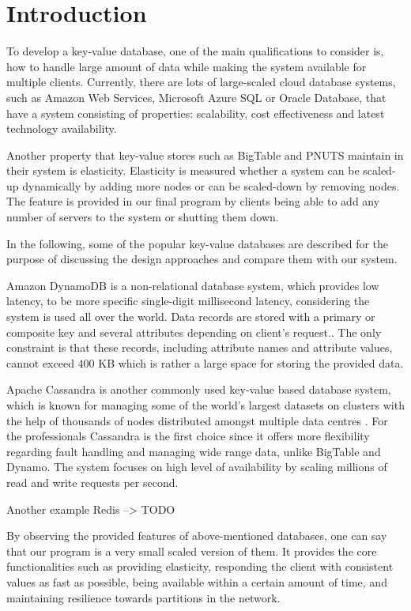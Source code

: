 \section{Introduction}
\label{sec:introduction}

To develop a key-value database, one of the main qualifications to consider is, how to handle large amount of data while making the system available for multiple clients. Currently, there are lots of large-scaled cloud database systems, such as Amazon Web Services, Microsoft Azure SQL or Oracle Database, that have a system consisting of properties: scalability, cost effectiveness and latest technology availability. 

Another property that key-value stores such as BigTable and PNUTS maintain in their system is elasticity. Elasticity is measured whether a system can be scaled-up dynamically by adding more nodes or can be scaled-down by removing nodes\cite{agrawal2011database}. The feature is provided in our final program by clients being able to add any number of servers to the system or shutting them down.

In the following, some of the popular key-value databases are described for the purpose of  discussing the design approaches and compare them with our system.

Amazon DynamoDB is a non-relational database system, which provides low latency, to be more specific single-digit millisecond latency\cite{amazon}, considering the system is used all over the world. Data records are stored with a primary or composite key and several attributes depending on client's request.\cite{kalid2017big}. The only constraint is that these records, including attribute names and attribute values, cannot exceed 400 KB which is rather a large space for storing the provided data\cite{amazon}.

Apache Cassandra is another commonly used key-value based database system, which is known for managing some of the world's largest datasets on clusters with the help of thousands of nodes distributed amongst multiple data centres \cite{chebotko2015big}. For the professionals Cassandra is the first choice since it offers more flexibility regarding fault handling and managing wide range data, unlike BigTable and Dynamo\cite{kalid2017big}. The system focuses on high level of availability by scaling millions of read and write requests per second.

Another example Redis --> TODO \cite{paksula2010persisting}

By observing the provided features of above-mentioned databases, one can say that our program is a very small scaled version of them. It provides the core functionalities such as providing elasticity, responding the client with consistent values as fast as possible, being available within a certain amount of time, and maintaining resilience towards partitions in the network.

